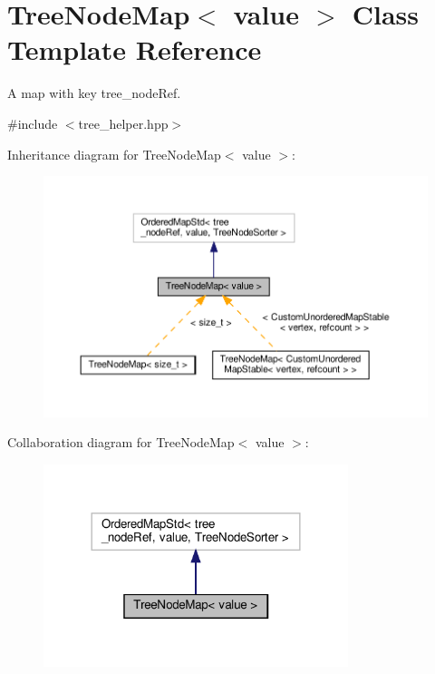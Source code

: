 \hypertarget{classTreeNodeMap}{}\section{Tree\+Node\+Map$<$ value $>$ Class Template Reference}
\label{classTreeNodeMap}


A map with key tree\+\_\+node\+Ref.  




{\ttfamily \#include $<$tree\+\_\+helper.\+hpp$>$}



Inheritance diagram for Tree\+Node\+Map$<$ value $>$\+:
\nopagebreak
\begin{figure}[H]
\begin{center}
\leavevmode
\includegraphics[width=350pt]{d5/db9/classTreeNodeMap__inherit__graph}
\end{center}
\end{figure}


Collaboration diagram for Tree\+Node\+Map$<$ value $>$\+:
\nopagebreak
\begin{figure}[H]
\begin{center}
\leavevmode
\includegraphics[width=252pt]{db/df6/classTreeNodeMap__coll__graph}
\end{center}
\end{figure}


